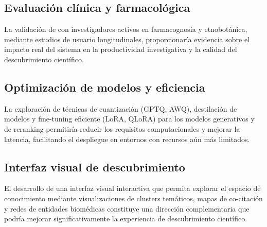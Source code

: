 \subsection{Evaluación clínica y farmacológica}
\label{subsec:fw_clinical}

La validación de \sirca{} con investigadores activos en farmacognosia y etnobotánica, mediante estudios de usuario longitudinales, proporcionaría evidencia sobre el impacto real del sistema en la productividad investigativa y la calidad del descubrimiento científico.

\subsection{Optimización de modelos y eficiencia}
\label{subsec:fw_efficiency}

La exploración de técnicas de cuantización (GPTQ, AWQ), destilación de modelos y fine-tuning eficiente (LoRA, QLoRA) para los modelos generativos y de reranking permitiría reducir los requisitos computacionales y mejorar la latencia, facilitando el despliegue en entornos con recursos aún más limitados.

\subsection{Interfaz visual de descubrimiento}
\label{subsec:fw_interface}

El desarrollo de una interfaz visual interactiva que permita explorar el espacio de conocimiento mediante visualizaciones de clusters temáticos, mapas de co-citación y redes de entidades biomédicas constituye una dirección complementaria que podría mejorar significativamente la experiencia de descubrimiento científico.
